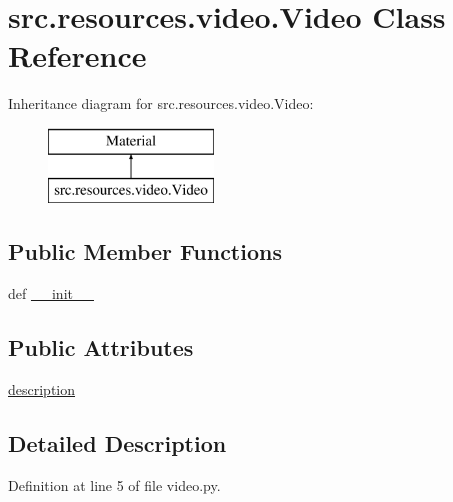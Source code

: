 \hypertarget{classsrc_1_1resources_1_1video_1_1_video}{\section{src.\+resources.\+video.\+Video Class Reference}
\label{classsrc_1_1resources_1_1video_1_1_video}
}
Inheritance diagram for src.\+resources.\+video.\+Video\+:\begin{figure}[H]
\begin{center}
\leavevmode
\includegraphics[height=2.000000cm]{classsrc_1_1resources_1_1video_1_1_video}
\end{center}
\end{figure}
\subsection*{Public Member Functions}
\begin{DoxyCompactItemize}
\item 
def \hyperlink{classsrc_1_1resources_1_1video_1_1_video_a715a09e9bc39544de57c1cf9a10da491}{\+\_\+\+\_\+init\+\_\+\+\_\+}
\end{DoxyCompactItemize}
\subsection*{Public Attributes}
\begin{DoxyCompactItemize}
\item 
\hyperlink{classsrc_1_1resources_1_1video_1_1_video_a0dc8832c83f1d52f217a6df00f755493}{description}
\end{DoxyCompactItemize}


\subsection{Detailed Description}


Definition at line 5 of file video.\+py.



